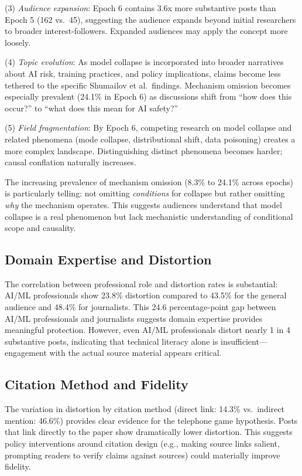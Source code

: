 \documentclass[twocolumn,11pt]{article}
\begin{document}
(3) \textit{Audience expansion}: Epoch 6 contains 3.6x more substantive posts than Epoch 5 (162 vs.\ 45), suggesting the audience expands beyond initial researchers to broader interest-followers. Expanded audiences may apply the concept more loosely.

(4) \textit{Topic evolution}: As model collapse is incorporated into broader narratives about AI risk, training practices, and policy implications, claims become less tethered to the specific Shumailov et al.\ findings. Mechanism omission becomes especially prevalent (24.1\% in Epoch 6) as discussions shift from ``how does this occur?'' to ``what does this mean for AI safety?''

(5) \textit{Field fragmentation}: By Epoch 6, competing research on model collapse and related phenomena (mode collapse, distributional shift, data poisoning) creates a more complex landscape. Distinguishing distinct phenomena becomes harder; causal conflation naturally increases.

The increasing prevalence of mechanism omission (8.3\% to 24.1\% across epochs) is particularly telling: not omitting \textit{conditions} for collapse but rather omitting \textit{why} the mechanism operates. This suggests audiences understand that model collapse is a real phenomenon but lack mechanistic understanding of conditional scope and causality.

\subsection{Domain Expertise and Distortion}

The correlation between professional role and distortion rates is substantial: AI/ML professionals show 23.8\% distortion compared to 43.5\% for the general audience and 48.4\% for journalists. This 24.6 percentage-point gap between AI/ML professionals and journalists suggests domain expertise provides meaningful protection. However, even AI/ML professionals distort nearly 1 in 4 substantive posts, indicating that technical literacy alone is insufficient---engagement with the actual source material appears critical.

\subsection{Citation Method and Fidelity}

The variation in distortion by citation method (direct link: 14.3\% vs.\ indirect mention: 46.6\%) provides clear evidence for the telephone game hypothesis. Posts that link directly to the paper show dramatically lower distortion. This suggests policy interventions around citation design (e.g., making source links salient, prompting readers to verify claims against sources) could materially improve fidelity.
\end{document}
